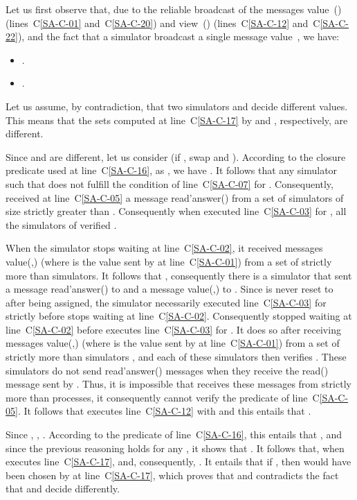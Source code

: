 \documentclass[11pt,letterpaper]{article}
\newlength {\afterproof}
\newcommand{\toto}{xxx}
\newenvironment{proofL}{\noindent{\bf Proof }}
{\hspace*{\fill}\par\vspace{\afterproof}}
\begin{document}
\begin{proofL}
Let us first observe that, due to the reliable broadcast of the messages
{\sc value}~() (lines~C\ref{SA-C-01} and~C\ref{SA-C-20})  and
{\sc view}~() (lines~C\ref{SA-C-12} and~C\ref{SA-C-22}), 
and the fact that a simulator broadcast a single message {\sc value}~, 
we have:
\begin{itemize}
\vspace{-0.2cm}
\item .
\vspace{-0.2cm}
\item .
\end{itemize}

Let us assume, by contradiction, that two simulators  and 
decide different values. This means that the sets  
  computed at line~C\ref{SA-C-17} by     and  ,
respectively,  are different.

Since  and  are different,
let us consider 
(if ,  swap  and ).
According to the closure predicate used at line~C\ref{SA-C-16},
as ,
we have  .
It follows that any simulator  such that  does not
fulfill the condition of line~C\ref{SA-C-07} for  .
Consequently,  received at line~C\ref{SA-C-05} a message
{\sc read'answer}()
from a set of simulators  of size strictly greater
than .
Consequently when  executed line~C\ref{SA-C-03} for , all the
simulators  of  verified .

When the simulator  stops waiting at line~C\ref{SA-C-02}, it received
messages {\sc value}(,)
(where  is the value sent by  at line~C\ref{SA-C-01})
from a set  of strictly more than  simulators.
It follows that , consequently
there is a  simulator  that sent
a message {\sc read'answer}() to  and a message
{\sc value}(,) to .
Since  is never reset to  after being assigned,
the simulator  necessarily executed line~C\ref{SA-C-03} for 
strictly before  stops waiting at line~C\ref{SA-C-02}. Consequently
 stopped waiting at line~C\ref{SA-C-02} before 
executes line~C\ref{SA-C-03} for . It does so after receiving
messages {\sc value}(,)
(where  is the value sent by  at line~C\ref{SA-C-01})
from a set  of strictly more than  simulators
, and each of these simulators then verifies .
These simulators do not send {\sc read'answer}() messages when
they receive the {\sc read}() message sent by .
Thus, it is impossible that  receives these messages from strictly
more than  processes,
it consequently cannot verify the predicate of line~C\ref{SA-C-05}. It
follows that  executes line~C\ref{SA-C-12} with
 and this entails that
.

Since , ,
.
According to the predicate of line~C\ref{SA-C-16}, this entails that
, and since the previous reasoning holds for any
, it shows that .
It follows that, when  executes line~C\ref{SA-C-17},  and,
consequently, . It entails that if
,
then  would have been chosen by  at
line~C\ref{SA-C-17}, which proves that 
and contradicts the fact that  and  decide differently.
\renewcommand{\toto}{lemma:safe-agr-agreement}
\end{proofL}
\end{document}
